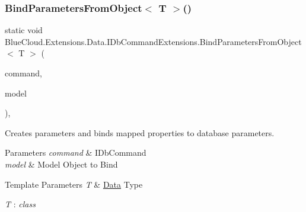\subsubsection{\texorpdfstring{Bind\+Parameters\+From\+Object$<$ T $>$()}{BindParametersFromObject< T >()}}
{\footnotesize\ttfamily static void Blue\+Cloud.\+Extensions.\+Data.\+I\+Db\+Command\+Extensions.\+Bind\+Parameters\+From\+Object$<$ T $>$ (\begin{DoxyParamCaption}\item[{this I\+Db\+Command}]{command,  }\item[{T}]{model }\end{DoxyParamCaption})\hspace{0.3cm}{\ttfamily [inline]}, {\ttfamily [static]}}



Creates parameters and binds mapped properties to database parameters. 


\begin{DoxyParams}{Parameters}
{\em command} & I\+Db\+Command\\
\hline
{\em model} & Model Object to Bind\\
\hline
\end{DoxyParams}

\begin{DoxyTemplParams}{Template Parameters}
{\em T} & \mbox{\hyperlink{namespace_blue_cloud_1_1_extensions_1_1_data}{Data}} Type\\
\hline
\end{DoxyTemplParams}
\begin{Desc}
\item[Type Constraints]\begin{description}
\item[{\em T} : {\em class}]\end{description}
\end{Desc}
\mbox{\label{class_blue_cloud_1_1_extensions_1_1_data_1_1_i_db_command_extensions_ade7a7c7734eb0342da8adab3fd64e1db}} 
